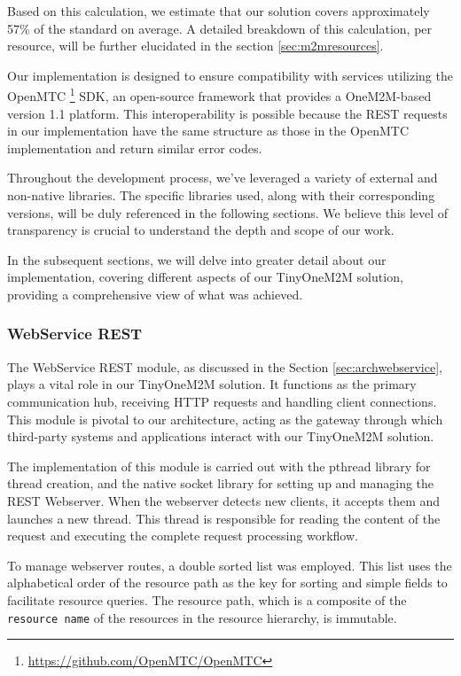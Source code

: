 \documentclass[a4paper,fleqn]{cas-dc}
\begin{document}
Based on this calculation, we estimate that our solution covers approximately 57\% of the standard on average. A detailed breakdown of this calculation, per resource, will be further elucidated in the section \ref{sec:m2mresources}.

Our implementation is designed to ensure compatibility with services utilizing the OpenMTC \footnote{\url{https://github.com/OpenMTC/OpenMTC}} SDK, an open-source framework that provides a OneM2M-based version 1.1 platform. This interoperability is possible because the REST requests in our implementation have the same structure as those in the OpenMTC implementation and return similar error codes.

Throughout the development process, we've leveraged a variety of external and non-native libraries. The specific libraries used, along with their corresponding versions, will be duly referenced in the following sections. We believe this level of transparency is crucial to understand the depth and scope of our work.

In the subsequent sections, we will delve into greater detail about our implementation, covering different aspects of our TinyOneM2M solution, providing a comprehensive view of what was achieved.

\subsubsection{WebService REST}

The WebService REST module, as discussed in the Section \ref{sec:archwebservice}, plays a vital role in our TinyOneM2M solution. It functions as the primary communication hub, receiving HTTP requests and handling client connections. This module is pivotal to our architecture, acting as the gateway through which third-party systems and applications interact with our TinyOneM2M solution.

The implementation of this module is carried out with the pthread library for thread creation, and the native socket library for setting up and managing the REST Webserver. When the webserver detects new clients, it accepts them and launches a new thread. This thread is responsible for reading the content of the request and executing the complete request processing workflow.

To manage webserver routes, a double sorted list was employed. This list uses the alphabetical order of the resource path as the key for sorting and simple fields to facilitate resource queries. The resource path, which is a composite of the \texttt{resource name} of the resources in the resource hierarchy, is immutable.
\end{document}
